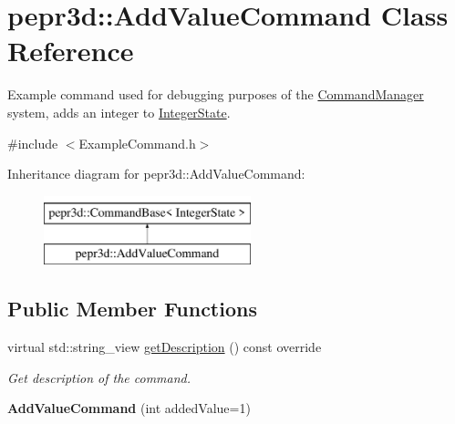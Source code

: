 \hypertarget{classpepr3d_1_1_add_value_command}{}\section{pepr3d\+::Add\+Value\+Command Class Reference}
\label{classpepr3d_1_1_add_value_command}


Example command used for debugging purposes of the \mbox{\hyperlink{classpepr3d_1_1_command_manager}{Command\+Manager}} system, adds an integer to \mbox{\hyperlink{structpepr3d_1_1_integer_state}{Integer\+State}}.  




{\ttfamily \#include $<$Example\+Command.\+h$>$}

Inheritance diagram for pepr3d\+::Add\+Value\+Command\+:\begin{figure}[H]
\begin{center}
\leavevmode
\includegraphics[height=2.000000cm]{classpepr3d_1_1_add_value_command}
\end{center}
\end{figure}
\subsection*{Public Member Functions}
\begin{DoxyCompactItemize}
\item 
\mbox{\label{classpepr3d_1_1_add_value_command_a8d2ff1529606aa443e872f6eb5b47a79}} 
virtual std\+::string\+\_\+view \mbox{\hyperlink{classpepr3d_1_1_add_value_command_a8d2ff1529606aa443e872f6eb5b47a79}{get\+Description}} () const override
\begin{DoxyCompactList}\small\item\em Get description of the command. \end{DoxyCompactList}\item 
\mbox{\label{classpepr3d_1_1_add_value_command_a43a418d4d88f54f4c345c63c865f6676}} 
{\bfseries Add\+Value\+Command} (int added\+Value=1)
\end{DoxyCompactItemize}
